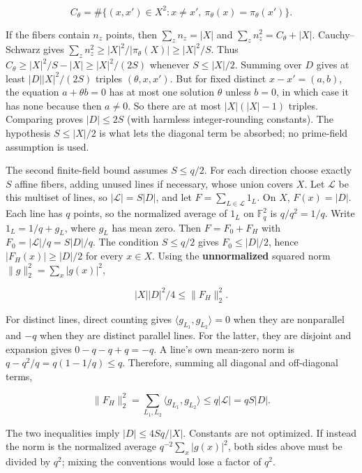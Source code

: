 \[C_\theta=\#\{(x,x')\in X^2:x\ne x',\ \pi_\theta(x)=\pi_\theta(x')\}.\]

If the fibers contain \(n_z\) points, then \(\sum_z n_z=|X|\) and \(\sum_z n_z^2=C_\theta+|X|\). Cauchy--Schwarz gives \(\sum_z n_z^2\ge |X|^2/|\pi_\theta(X)|\ge |X|^2/S\). Thus \(C_\theta\ge |X|^2/S-|X|\ge |X|^2/(2S)\) whenever \(S\le |X|/2\). Summing over \(D\) gives at least \(|D||X|^2/(2S)\) triples \((\theta,x,x')\). But for fixed distinct \(x-x'=(a,b)\), the equation \(a+\theta b=0\) has at most one solution \(\theta\) unless \(b=0\), in which case it has none because then \(a\ne0\). So there are at most \(|X|(|X|-1)\) triples. Comparing proves \(|D|\le 2S\) (with harmless integer-rounding constants). The hypothesis \(S\le |X|/2\) is what lets the diagonal term be absorbed; no prime-field assumption is used.

The second finite-field bound assumes \(S\le q/2\). For each direction choose exactly \(S\) affine fibers, adding unused lines if necessary, whose union covers \(X\). Let \(\mathcal L\) be this multiset of lines, so \(|\mathcal L|=S|D|\), and let \(F=\sum_{L\in\mathcal L}1_L\). On \(X\), \(F(x)=|D|\). Each line has \(q\) points, so the normalized average of \(1_L\) on \(\mathbb F_q^2\) is \(q/q^2=1/q\). Write \(1_L=1/q+g_L\), where \(g_L\) has mean zero. Then \(F=F_0+F_H\) with \(F_0=|\mathcal L|/q=S|D|/q\). The condition \(S\le q/2\) gives \(F_0\le |D|/2\), hence \(|F_H(x)|\ge |D|/2\) for every \(x\in X\). Using the \textbf{unnormalized} squared norm \(\|g\|_2^2=\sum_x|g(x)|^2\),

\[|X||D|^2/4\le \|F_H\|_2^2.\]

For distinct lines, direct counting gives \(\langle g_{L_1},g_{L_2}\rangle=0\) when they are nonparallel and \(-q\) when they are distinct parallel lines. For the latter, they are disjoint and expansion gives \(0-q-q+q=-q\). A line's own mean-zero norm is \(q-q^2/q=q(1-1/q)\le q\). Therefore, summing all diagonal and off-diagonal terms,

\[\|F_H\|_2^2=\sum_{L_1,L_2}\langle g_{L_1},g_{L_2}\rangle\le q|\mathcal L|=qS|D|.\]

The two inequalities imply \(|D|\le 4Sq/|X|\). Constants are not optimized. If instead the norm is the normalized average \(q^{-2}\sum_x|g(x)|^2\), both sides above must be divided by \(q^2\); mixing the conventions would lose a factor of \(q^2\).

